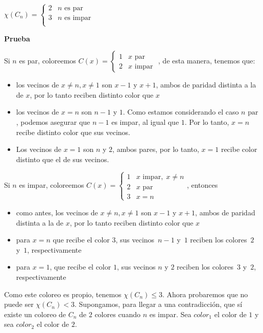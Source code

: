 \documentclass[10pt,a4paper]{article}
\begin{document}
\begin{center}
$\chi(C_n) = \begin{cases} 2 & n \text{ es par}\\ 3 & n \text{ es impar}\\ \end{cases}$
\end{center}

\textbf{Prueba}

Si $n$ es par, coloreemos $C(x) = 
\begin{cases}
1 & x \text{ par }\\
2 & x \text{ impar }
\end{cases}$, de esta manera, tenemos que:

\begin{itemize}

	\item los vecinos de $x\neq n, x\neq 1$ son $x-1$ y $x +1$, ambos de paridad distinta a la de $x$, por lo tanto reciben distinto color que $x$
	\item los vecinos de $x=n$ son $n-1$ y $1$. Como estamos considerando el caso $n \text{ par }$, podemos asegurar que $n-1$ es impar, al igual que $1$. Por lo tanto, $x=n$ recibe distinto color que sus vecinos.
	\item Los vecinos de $x = 1$ son $n$ y $2$, ambos pares, por lo tanto, $x=1$ recibe color distinto que el de sus vecinos.
\end{itemize}

Si $n$ es impar, coloreemos $C(x) = 
\begin{cases}
1 & x \text{ impar}, \;x\neq n\\
2 & x \text{ par }\\
3 & x = n
\end{cases}$, entonces

\begin{itemize}

	\item como antes, los vecinos de $x\neq n, x\neq 1$ son $x-1$ y $x +1$, ambos de paridad distinta a la de $x$, por lo tanto reciben distinto color que $x$
	\item para $x=n$ que recibe el color $3$, sus vecinos $n-1$ y $1$ reciben los colores $2$ y $1$, respectivamente
	\item para $x=1$, que recibe el color $1$, sus vecinos $n$ y $2$ reciben los colores $3$ y $2$, respectivamente
\end{itemize}

Como este coloreo es propio, tenemos $\chi(C_n) \leq 3$. Ahora probaremos que no puede ser $\chi(C_n) < 3$. Supongamos, para llegar a una contradicción, que sí existe un coloreo de $C_n$ de $2$ colores cuando $n$ es impar. Sea $color_1$ el color de $1$ y sea $color_2$ el color de $2$.
\end{document}

